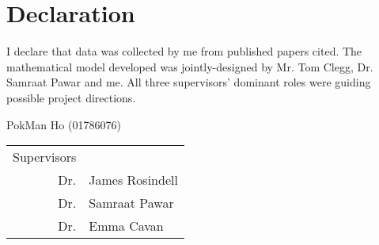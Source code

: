 \documentclass[../thesis.tex]{subfiles} %
\begin{document}
\maketitle\clearpage

\section*{Declaration}
I declare that data was collected by me from published papers cited.  The mathematical model developed was jointly-designed by Mr. Tom Clegg, Dr. Samraat Pawar and me.  All three supervisors' dominant roles were guiding possible project directions.

\begin{flushright}
PokMan Ho (01786076)

\begin{tabular}{rl}
    Supervisors & \\
    Dr. & James Rosindell \\
    Dr. & Samraat Pawar \\
    Dr. & Emma Cavan
\end{tabular}
\end{flushright}

\tableofcontents
\listoffigures
\listoftables
\end{document}
